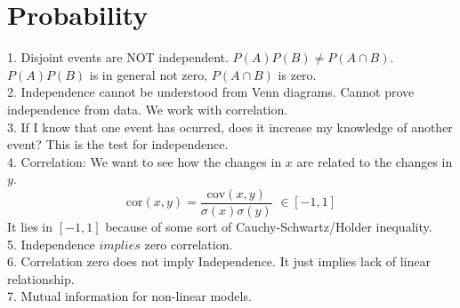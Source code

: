 \documentclass{article}
\newcommand{\beq}{\begin{equation}}
\newcommand{\eeq}{\end{equation}}
\begin{document}
\section{Probability}
1. Disjoint events are NOT independent. $P(A)P(B)\ne{}P(A\cap{B})$. $P(A)P(B)$ is in general not zero, $P(A\cap{B})$ is zero.\\
2. Independence cannot be understood from Venn diagrams. Cannot prove independence from data. We work with correlation. \\
3. If I know that one event has ocurred, does it increase my knowledge of another event? This is the test for independence. \\
4. Correlation: We want to see how the changes in $x$ are related to the changes in $y$.\\
\beq
\text{cor}(x,y) = \frac{\text{cov}(x,y)}{\sigma(x)\sigma(y)}\,\,\in [-1,1] 
\eeq
It lies in $[-1,1]$ because of some sort of Cauchy-Schwartz/Holder inequality.\\
5. Independence $implies$ zero correlation.\\
6. Correlation zero does not imply Independence. It just implies lack of linear relationship.\\
7. Mutual information for non-linear models.
\end{document}

